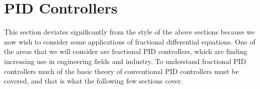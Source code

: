 \documentclass{unswmaths}
\begin{document}






	

\section*{PID Controllers}

This section deviates significantly from the style of the above sections because we now wish to consider some applications of fractional differential equations. 
One of the areas that we will consider are fractional PID controllers, which are finding increasing use in engineering fields and industry. To understand fractional
PID controllers much of the basic theory of conventional PID controllers must be covered, and that is what the following few sections cover.
\end{document}
